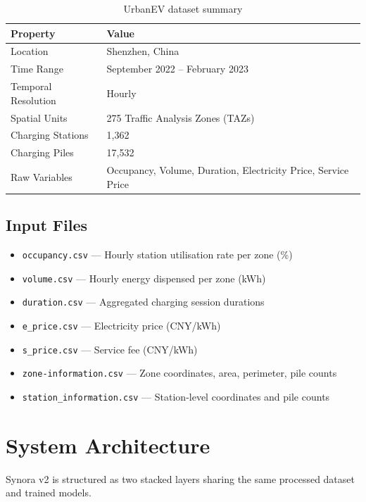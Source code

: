 \documentclass[12pt,a4paper]{article}
\begin{document}
\begin{table}[H]
\centering
\begin{tabular}{ll}
\toprule
\textbf{Property} & \textbf{Value} \\
\midrule
Location & Shenzhen, China \\
Time Range & September 2022 – February 2023 \\
Temporal Resolution & Hourly \\
Spatial Units & 275 Traffic Analysis Zones (TAZs) \\
Charging Stations & 1,362 \\
Charging Piles & 17,532 \\
Raw Variables & Occupancy, Volume, Duration, Electricity Price, Service Price \\
\bottomrule
\end{tabular}
\caption{UrbanEV dataset summary}
\end{table}

\subsection*{Input Files}

\begin{itemize}[leftmargin=*]
  \item \texttt{occupancy.csv} — Hourly station utilisation rate per zone (\%)
  \item \texttt{volume.csv} — Hourly energy dispensed per zone (kWh)
  \item \texttt{duration.csv} — Aggregated charging session durations
  \item \texttt{e\_price.csv} — Electricity price (CNY/kWh)
  \item \texttt{s\_price.csv} — Service fee (CNY/kWh)
  \item \texttt{zone-information.csv} — Zone coordinates, area, perimeter, pile counts
  \item \texttt{station\_information.csv} — Station-level coordinates and pile counts
\end{itemize}

\section{System Architecture}

Synora v2 is structured as two stacked layers sharing the same processed dataset and trained models.
\end{document}
